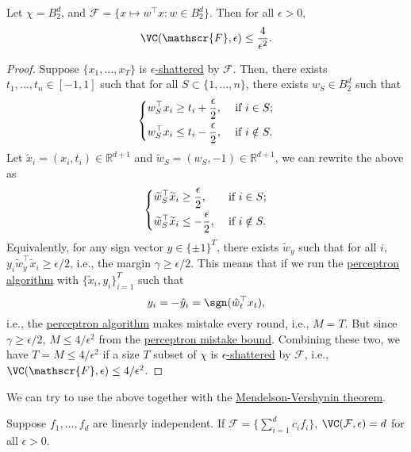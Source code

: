\begin{theorem}\label{thm:perceptron}
	Let \(\chi = B_2^d\), and \(\mathscr{F} = \{ x \mapsto w^{\top} x \colon w \in B_2^d \} \). Then for all \(\epsilon > 0\),
	\[
		\VC(\mathscr{F} , \epsilon ) \leq \frac{4}{\epsilon ^2}.
	\]
\end{theorem}
\begin{proof}
	Suppose \(\{x_1, \ldots, x_T\}\) is \hyperref[def:eps-shattered]{\(\epsilon\)-shattered} by \(\mathcal{F}\). Then, there exists \(t_1, \ldots, t_n \in [-1,1]\) such that for all \(S \subset \{1, \ldots , n\}\), there exists \(w_S \in B_2^d\) such that
	\[
		\begin{dcases}
			w_S^{\top} x_i \geq t_i +\frac{\epsilon}{2}, & \text{ if } i \in S ;   \\
			w_S^{\top} x_i \leq t_i -\frac{\epsilon}{2}, & \text{ if } i \notin S.
		\end{dcases}
	\]
	Let \(\widetilde{x}_i = (x_i, t_i) \in \mathbb{R} ^{d+1}\) and \(\widetilde{w}_S = (w_S, -1) \in \mathbb{R} ^{d+1}\), we can rewrite the above as
	\[
		\begin{dcases}
			\widetilde{w}_S^{\top} \widetilde{x}_i \geq \frac{\epsilon}{2},  & \text{ if } i \in S ;    \\
			\widetilde{w}_S^{\top} \widetilde{x}_i \leq -\frac{\epsilon}{2}, & \text{ if } i \notin S .
		\end{dcases}
	\]
	Equivalently, for any sign vector \(y\in \{ \pm 1 \} ^T\), there exists \(\widetilde{w} _y\) such that for all \(i\), \(y_i \widetilde{w} _y ^{\top} \widetilde{x} _i \geq \epsilon / 2\), i.e., the margin \(\gamma \geq \epsilon / 2\). This means that if we run the \hyperref[algo:perceptron]{perceptron algorithm} with \(\{\widetilde{x}_i, y_i\}_{i=1}^T\) such that
	\[
		y_i = - \hat{y} _i = \sgn (\hat{w} _t ^{\top} x_t),
	\]
	i.e., the \hyperref[algo:perceptron]{perceptron algorithm} makes mistake every round, i.e., \(M = T\). But since \(\gamma \geq \epsilon / 2\), \(M \leq 4/\epsilon^2\) from the \hyperref[lma:perceptron-mistake-bound]{perceptron mistake bound}. Combining these two, we have \(T = M \leq 4 / \epsilon ^2\) if a size \(T\) subset of \(\chi \) is \hyperref[def:eps-shattered]{\(\epsilon\)-shattered} by \(\mathcal{F}\), i.e., \(\VC(\mathscr{F} , \epsilon ) \leq 4 / \epsilon ^2\).
\end{proof}

\begin{remark}
	We can try to use the above together with the \hyperref[thm:Mendelson-Vershynin]{Mendelson-Vershynin theorem}.
\end{remark}

\begin{remark}
	Suppose \(f_1,\ldots,f_d\) are linearly independent. If \(\mathcal{F} = \{\sum_{i=1}^d c_i f_i\}\), \(\VC(\mathcal{F}, \epsilon) = d\) for all \(\epsilon > 0\).
\end{remark}